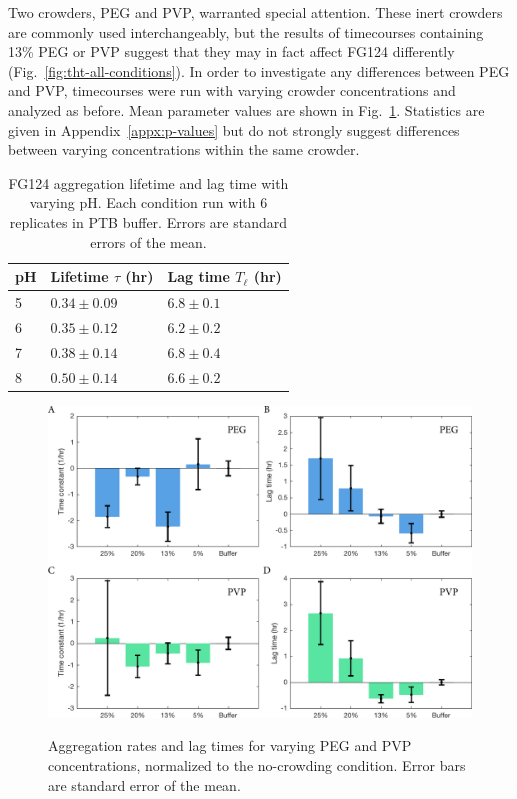 Two crowders, PEG and PVP, warranted special attention.  These inert crowders are commonly used interchangeably, but the results of timecourses containing 13\% PEG or PVP suggest that they may in fact affect FG124 differently (Fig.~\ref{fig:tht-all-conditions}).  In order to investigate any differences between PEG and PVP, timecourses were run with varying crowder concentrations and analyzed as before.  Mean parameter values are shown in Fig.~\ref{fig:peg-pvp}.  Statistics are given in Appendix~\ref{appx:p-values} but do not strongly suggest differences between varying concentrations within the same crowder.

\begin{table}[b!]
\centering
  \caption[Aggregation lifetimes and lag times with varying pH.]{FG124 aggregation lifetime and lag time with varying pH. Each condition run with 6 replicates in PTB buffer.  Errors are standard errors of the mean.}
    \label{table:FG124-pH}
    \begin{tabular}{p{1cm}p{3cm}p{3cm}}
      pH & Lifetime $\tau$ (hr) & Lag time $T_\ell$ (hr) \\
      \hline
      5 & $0.34 \pm 0.09$ & $6.8 \pm 0.1$ \\
      6 & $0.35 \pm 0.12$ & $6.2 \pm 0.2$ \\
      7 & $0.38 \pm 0.14$ & $6.8 \pm 0.4$ \\
      8 & $0.50 \pm 0.14$ & $6.6 \pm 0.2$ \\
    \end{tabular}
\end{table}

\begin{figure}[t!]
\caption[Aggregation rates and lag times for varying PEG and PVP concentrations.]{Aggregation rates and lag times for varying PEG and PVP concentrations, normalized to the no-crowding condition. Error bars are standard error of the mean.}
\centering
\includegraphics[width=\textwidth]{figs/ch05/peg-and-pvp-charts.pdf}
\label{fig:peg-pvp}
\end{figure}

